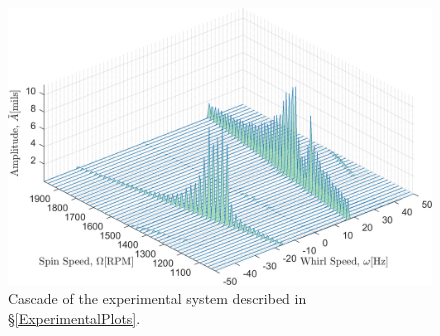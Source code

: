 \begin{figure}
	\centering
	\includegraphics[width=\linewidth]{./figures/ExpExampleCascade.png}
	\caption{Cascade of the experimental system described in \S\ref{ExperimentalPlots}.}
	\label{fig:ExpExampleCascade}
\end{figure}
